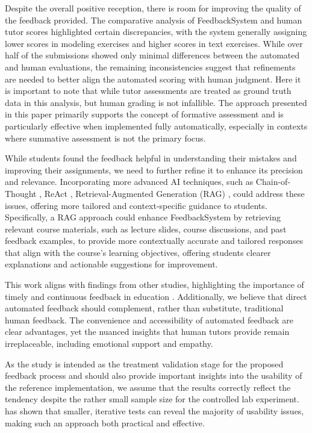 \documentclass[sigconf,screen,review,anonymous]{acmart}
\begin{document}
Despite the overall positive reception, there is room for improving the quality of the feedback provided.
The comparative analysis of FeedbackSystem and human tutor scores highlighted certain discrepancies, with the system generally assigning lower scores in modeling exercises and higher scores in text exercises.
While over half of the submissions showed only minimal differences between the automated and human evaluations, the remaining inconsistencies suggest that refinements are needed to better align the automated scoring with human judgment.
Here it is important to note that while tutor assessments are treated as ground truth data in this analysis, but human grading is not infallible.
The approach presented in this paper primarily supports the concept of formative assessment and is particularly effective when implemented fully automatically, especially in contexts where summative assessment is not the primary focus.

While students found the feedback helpful in understanding their mistakes and improving their assignments, we need to further refine it to enhance its precision and relevance.
Incorporating more advanced AI techniques, such as Chain-of-Thought \cite{wei:2022:ChainofThoughtPromptingElicits}, ReAct \cite{yao:2023:ReActSynergizingReasoning}, Retrieval-Augmented Generation (RAG) \cite{gao:2024:RetrievalAugmentedGenerationLarge},
could address these issues, offering more tailored and context-specific guidance to students.
Specifically, a RAG approach could enhance FeedbackSystem by retrieving relevant course materials, such as lecture slides, course discussions, and past feedback examples, to provide more contextually accurate and tailored responses that align with the course's learning objectives, offering students clearer explanations and actionable suggestions for improvement.

This work aligns with findings from other studies, highlighting the importance of timely and continuous feedback in education \cite{shute:2008:FocusFormativeFeedback, dawson:2019:WhatMakesEffective}.
Additionally, we believe that direct automated feedback should complement, rather than substitute, traditional human feedback.
The convenience and accessibility of automated feedback are clear advantages, yet the nuanced insights that human tutors provide remain irreplaceable, including emotional support and empathy.

As the study is intended as the treatment validation stage for the proposed feedback process and should also provide important insights into the usability of the reference implementation, we assume that the results correctly reflect the tendency despite the rather small sample size for the controlled lab experiment. 
\citet{nielsen:2000:WhyYouOnly} has shown that smaller, iterative tests can reveal the majority of usability issues, making such an approach both practical and effective.
\end{document}
